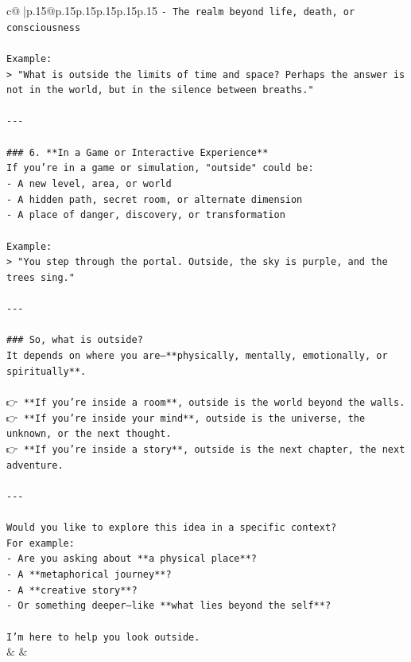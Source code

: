 \documentclass{article}
\begin{document}
{\begin{supertabular}{c@{$\;$}|p{.15\linewidth}@{}p{.15\linewidth}p{.15\linewidth}p{.15\linewidth}p{.15\linewidth}p{.15\linewidth}}
{{{\texttt{{-} The realm beyond life, death, or consciousness} \\
\\ 
\texttt{Example:  } \\
\texttt{> "What is outside the limits of time and space? Perhaps the answer is not in the world, but in the silence between breaths."} \\
\\ 
\texttt{{-}{-}{-}} \\
\\ 
\texttt{\#\#\# 6. **In a Game or Interactive Experience**} \\
\texttt{If you're in a game or simulation, "outside" could be:} \\
\texttt{{-} A new level, area, or world  } \\
\texttt{{-} A hidden path, secret room, or alternate dimension  } \\
\texttt{{-} A place of danger, discovery, or transformation} \\
\\ 
\texttt{Example:  } \\
\texttt{> "You step through the portal. Outside, the sky is purple, and the trees sing."} \\
\\ 
\texttt{{-}{-}{-}} \\
\\ 
\texttt{\#\#\# So, what is outside?} \\
\texttt{It depends on where you are—**physically, mentally, emotionally, or spiritually**.} \\
\\ 
\texttt{👉 **If you're inside a room**, outside is the world beyond the walls.  } \\
\texttt{👉 **If you're inside your mind**, outside is the universe, the unknown, or the next thought.  } \\
\texttt{👉 **If you're inside a story**, outside is the next chapter, the next adventure.} \\
\\ 
\texttt{{-}{-}{-}} \\
\\ 
\texttt{Would you like to explore this idea in a specific context?  } \\
\texttt{For example:} \\
\texttt{{-} Are you asking about **a physical place**?} \\
\texttt{{-} A **metaphorical journey**?} \\
\texttt{{-} A **creative story**?} \\
\texttt{{-} Or something deeper—like **what lies beyond the self**?} \\
\\ 
\texttt{I'm here to help you look outside.} \\
            }
        }
    }
    & & \\ \\


\end{supertabular}}
\end{document}
